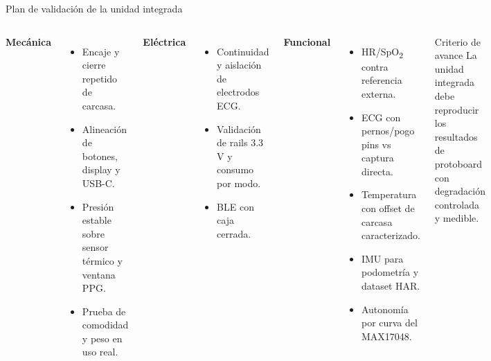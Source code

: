 \documentclass[aspectratio=169, 10pt]{beamer}
\begin{document}
\begin{frame}{Plan de validaci\'on de la unidad integrada}
    \footnotesize
    \begin{columns}[T]
        \textbf{Mec\'anica}
        \begin{itemize}\itemsep0.1cm
            \item Encaje y cierre repetido de carcasa.
            \item Alineaci\'on de botones, display y USB-C.
            \item Presi\'on estable sobre sensor t\'ermico y ventana PPG.
            \item Prueba de comodidad y peso en uso real.
        \end{itemize}
        \vspace{0.15cm}
        \textbf{El\'ectrica}
        \begin{itemize}\itemsep0.1cm
            \item Continuidad y aislaci\'on de electrodos ECG.
            \item Validaci\'on de rails 3.3 V y consumo por modo.
            \item BLE con caja cerrada.
        \end{itemize}
        \textbf{Funcional}
        \begin{itemize}\itemsep0.1cm
            \item HR/SpO\textsubscript{2} contra referencia externa.
            \item ECG con pernos/pogo pins vs captura directa.
            \item Temperatura con offset de carcasa caracterizado.
            \item IMU para podometr\'ia y dataset HAR.
            \item Autonom\'ia por curva del MAX17048.
        \end{itemize}
        \vspace{0.2cm}
        \begin{alertblock}{Criterio de avance}
            \scriptsize La unidad integrada debe reproducir los resultados de protoboard con degradaci\'on controlada y medible.
        \end{alertblock}
    \end{columns}
\end{frame}
\end{document}
